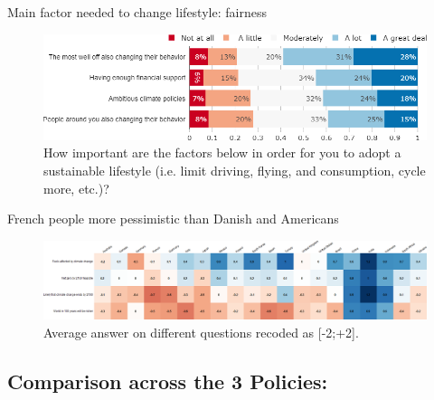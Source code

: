 \begin{framefont}{\small}
\begin{frame}{Main factor needed to change lifestyle: fairness}%
\begin{figure}[h!]
\centering
\caption{How important are the factors below in order for you to adopt a sustainable lifestyle (i.e. limit driving, flying, and consumption, cycle more, etc.)?}
\includegraphics[width=.87\paperwidth]{../figures/FR/condition_FR.png}
\end{figure}
\end{frame}


\begin{frame}{French people more pessimistic than Danish and Americans}%
\begin{figure}[h!]
\centering
\caption{Average answer on different questions recoded as [-2;+2].}
\includegraphics[width=\paperwidth]{../figures/country_comparison/future_mean_countries.png}
\end{figure}
\end{frame}


\subsection{Comparison across the 3 Policies:}


\end{framefont}
